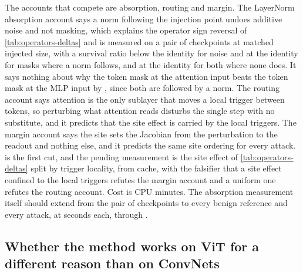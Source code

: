 \documentclass[../main.tex]{subfiles}
\begin{document}
The accounts that compete are absorption, routing and margin. The LayerNorm absorption account says a norm following the injection point undoes additive noise and not masking, which explains the operator sign reversal of \cref{tab:operators-deltas} and is measured on a pair of checkpoints at matched injected size, with a survival ratio below the identity for noise and at the identity for masks where a norm follows, and at the identity for both where none does. It says nothing about why the token mask at the attention input beats the token mask at the MLP input by \AttentionInputMinusMlpInputTokenMask{}, since both are followed by a norm. The routing account says attention is the only sublayer that moves a local trigger between tokens, so perturbing what attention reads disturbs the single step with no substitute, and it predicts that the site effect is carried by the local triggers. The margin account says the site sets the Jacobian from the perturbation to the readout and nothing else, and it predicts the same site ordering for every attack.  is the first cut, and the pending measurement is the site effect of \cref{tab:operators-deltas} split by trigger locality, from cache, with the falsifier that a site effect confined to the local triggers refutes the margin account and a uniform one refutes the routing account. Cost is CPU minutes. The absorption measurement itself should extend from the pair of checkpoints to every benign reference and every attack, at seconds each, through .

\subsection{Whether the method works on ViT for a different reason than on ConvNets}
\end{document}
